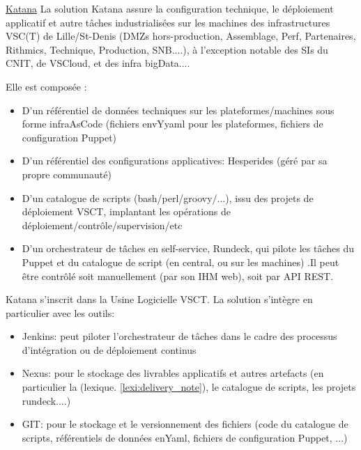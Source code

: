 \href{https://wiki.vsct.fr/display/KTN/KATANA+Accueil}{Katana}
La solution Katana assure la configuration technique, le déploiement applicatif et autre tâches industrialisées sur les machines des infrastructures VSC(T) de Lille/St-Denis (DMZs hors-production, Assemblage, Perf, Partenaires, Rithmics, Technique, Production, SNB....), à l'exception notable des SIs du CNIT, de VSCloud, et des infra bigData....

Elle est composée :
\begin{itemize}
  \item D'un référentiel de données techniques sur les plateformes/machines sous forme infraAsCode (fichiers envYyaml pour les plateformes, fichiers de configuration Puppet)
  \item D'un référentiel des configurations applicatives: Hesperides (géré par sa propre communauté)
  \item D'un catalogue de scripts (bash/perl/groovy/...), issu des projets de déploiement VSCT, implantant les opérations de déploiement/contrôle/supervision/etc
  \item D'un orchestrateur de tâches en self-service, Rundeck, qui pilote les tâches du Puppet et du catalogue de script (en central, ou sur les machines) .Il peut être contrôlé soit manuellement (par son IHM web), soit par API REST.
\end{itemize}

Katana s'inscrit dans la Usine Logicielle VSCT. La solution s'intègre en particulier avec les outils:
\begin{itemize}
  \item Jenkins: peut piloter l'orchestrateur de tâches dans le cadre des processus d'intégration ou de déploiement continus
  \item Nexus: pour le stockage des livrables applicatifs et autres artefacts (en particulier la (lexique. \ref{lexi:delivery_note}), le catalogue de scripts, les projets rundeck....)
  \item GIT: pour le stockage et le versionnement des fichiers (code du catalogue de scripts, référentiels de données enYaml, fichiers de configuration Puppet, ...)
\end{itemize}
